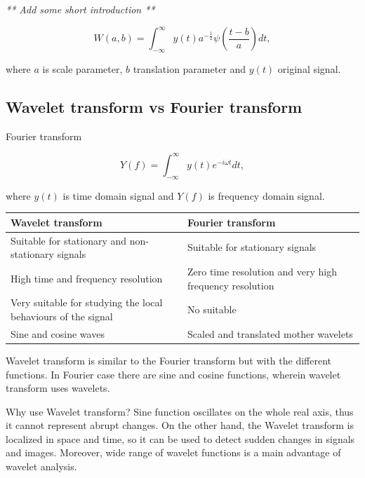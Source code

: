 \textit{** Add some short introduction **}

\begin{equation}
W(a,b)=\int_{-\infty}^{\infty} y(t) a^{-\frac{1}{2}} \psi\left(\frac{t-b}{a}\right) dt,
\end{equation}

where $a$ is scale parameter, $b$ translation parameter and $y(t)$ original signal.

\subsection{Wavelet transform vs Fourier transform}

Fourier transform

\begin{equation}
Y(f)=\int_{-\infty}^{\infty} y(t) e^{-i\omega t} dt,
\end{equation}

where $y(t)$ is time domain signal and $Y(f)$ is frequency domain signal.

\begin{table}[]
\centering
\begin{tabular}{|p{0.5\linewidth}|p{0.5\linewidth}|}
\toprule
\textbf{ Wavelet transform} & \textbf{Fourier transform}
\\ \midrule
Suitable for stationary and non-stationary signals 
& Suitable for stationary signals 
\\ \midrule
High time and frequency resolution
& Zero time resolution and very high frequency resolution     
\\ \midrule
Very suitable for studying the local behaviours of the signal
& No suitable  
\\ \midrule
Sine and cosine waves
& Scaled and translated mother wavelets
\\ \bottomrule
\end{tabular}
\end{table}

Wavelet transform is similar to the Fourier transform but with the different functions. In Fourier case there are sine and cosine functions, wherein wavelet transform uses wavelets.

Why use Wavelet transform?
Sine function oscillates on the whole real axis, thus it cannot represent abrupt changes. On the other hand, the Wavelet transform is localized in space and time, so it can be used to detect sudden changes in signals and images. Moreover, wide range of wavelet functions is a main advantage of wavelet analysis.

